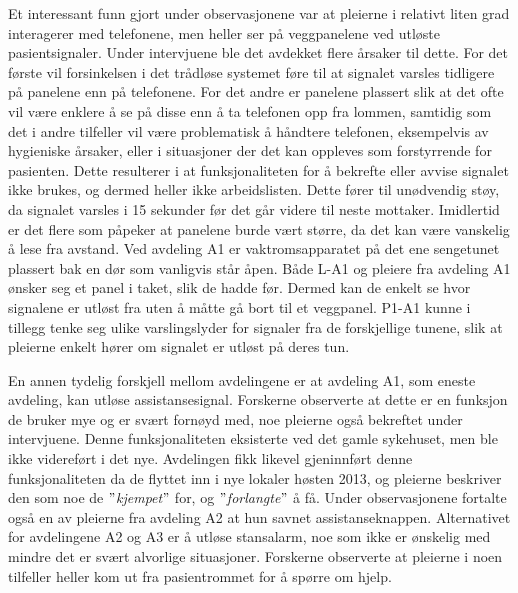 \noindent
Et interessant funn gjort under observasjonene var at pleierne i relativt liten grad interagerer med telefonene, men heller ser på veggpanelene ved utløste pasientsignaler. Under intervjuene ble det avdekket flere årsaker til dette. For det første vil forsinkelsen i det trådløse systemet føre til at signalet varsles tidligere på panelene enn på telefonene. For det andre er panelene plassert slik at det ofte vil være enklere å se på disse enn å ta telefonen opp fra lommen, samtidig som det i andre tilfeller vil være problematisk å håndtere telefonen, eksempelvis av hygieniske årsaker, eller i situasjoner der det kan oppleves som forstyrrende for pasienten. Dette resulterer i at funksjonaliteten for å bekrefte eller avvise signalet ikke brukes, og dermed heller ikke arbeidslisten. Dette fører til unødvendig støy, da signalet varsles i 15 sekunder før det går videre til neste mottaker. Imidlertid er det flere som påpeker at panelene burde vært større, da det kan være vanskelig å lese fra avstand. Ved avdeling A1 er vaktromsapparatet på det ene sengetunet plassert bak en dør som vanligvis står åpen. Både L-A1 og pleiere fra avdeling A1 ønsker seg et panel i taket, slik de hadde før. Dermed kan de enkelt se hvor signalene er utløst fra uten å måtte gå bort til et veggpanel. P1-A1 kunne i tillegg tenke seg ulike varslingslyder for signaler fra de forskjellige tunene, slik at pleierne enkelt hører om signalet er utløst på deres tun.

\noindent
En annen tydelig forskjell mellom avdelingene er at avdeling A1, som eneste avdeling, kan utløse assistansesignal. Forskerne observerte at dette er en funksjon de bruker mye og er svært fornøyd med, noe pleierne også bekreftet under intervjuene. Denne funksjonaliteten eksisterte ved det gamle sykehuset, men ble ikke videreført i det nye. Avdelingen fikk likevel gjeninnført denne funksjonaliteten da de flyttet inn i nye lokaler høsten 2013, og pleierne beskriver den som noe de \textit{$"$kjempet$"$} for, og \textit{$"$forlangte$"$} å få. Under observasjonene fortalte også en av pleierne fra avdeling A2 at hun savnet assistanseknappen. Alternativet for avdelingene A2 og A3 er å utløse stansalarm, noe som ikke er ønskelig med mindre det er svært alvorlige situasjoner. Forskerne observerte at pleierne i noen tilfeller heller kom ut fra pasientrommet for å spørre om hjelp.

